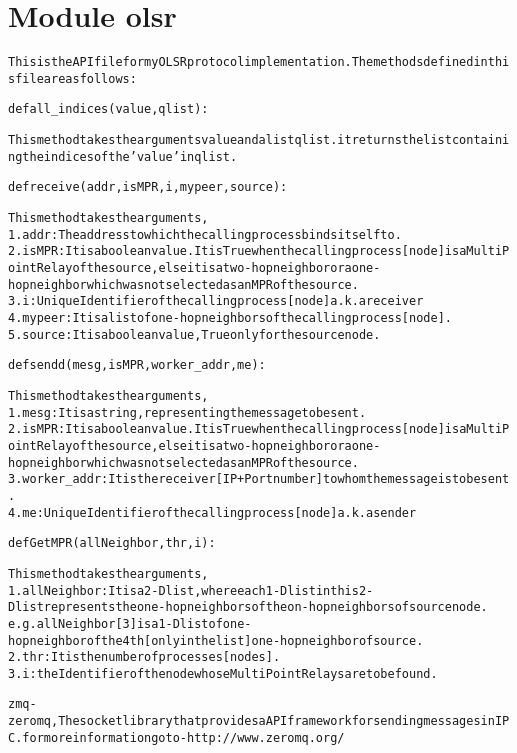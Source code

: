 %
%
%


\section{Module olsr}

    \label{olsr}
\begin{alltt}

This is the API file for my OLSR protocol implementation. The methods defined in this file are as follows:

def all\_indices(value, qlist):

     This method takes the arguments value and a list qlist. it returns the list containing the indices of the 'value' in qlist.
    
def receive(addr, isMPR, i, mypeer, source):

     This method takes the arguments, 
    1. addr: The address to which the calling process binds itself to.
    2. isMPR: It is a boolean value. It is True when the calling process [node] is a Multi Point Relay of the source, else it is a two-hop neighbor or a one-hop neighbor which was not selected as an MPR of the source.
    3. i: Unique Identifier of the calling process[node] a.k.a receiver
    4. mypeer: It is a list of one-hop neighbors of the calling process[node].
    5. source: It is a boolean value, True only for the source node.
    
def sendd(mesg, isMPR, worker\_addr, me):

     This method takes the arguments, 
    1. mesg: It is a string, representing the message to be sent.
    2. isMPR: It is a boolean value. It is True when the calling process [node] is a Multi Point Relay of the source, else it is a two-hop neighbor or  a one-hop neighbor which was not selected as an MPR of the source.
    3. worker\_addr: It is the receiver[IP+Port number] to whom the message is to be sent.
    4. me: Unique Identifier of the calling process[node] a.k.a sender

def GetMPR(allNeighbor, thr, i):

     This method takes the arguments, 
    1. allNeighbor: It is a 2-D list, where each 1-D list in this 2-D list represents the one-hop neighbors of the on-hop neighbors of source node.
        e.g. allNeighbor[3] is a 1-D list of one-hop neighbor of the 4th[only in the list] one-hop neighbor of source.
    2. thr: It is the number of processes [nodes].
    3. i: the Identifier of the node whose Multi Point Relays are to be found.


zmq - zeromq, The socket library that provides a API framework for sending messages in IPC. for more information goto - http://www.zeromq.org/
\end{alltt}


